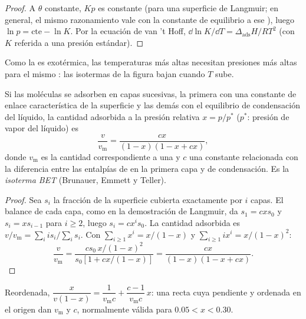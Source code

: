 \begin{proof}
A $\theta$ constante, $Kp$ es constante (para una superficie de Langmuir; en general, el mismo
razonamiento vale con la constante de equilibrio a ese ), luego $\ln p =
\text{cte} - \ln K$. Por la ecuación de van 't Hoff, $\dd\ln K/\dd T = \Delta_{\mathrm{ads}}H/RT^2$ (con $K$
referida a una presión estándar).
\end{proof}

Como la  es exotérmica, las temperaturas más altas necesitan presiones más altas para
el mismo : las isotermas de la figura bajan cuando $T$ sube.

\begin{theorem}\label{thm:b3:surfaces-catalysis:bet}
Si las moléculas se adsorben en capas sucesivas, la primera con una constante de enlace
característica de la superficie y las demás con el equilibrio de condensación
del líquido, la cantidad adsorbida a la presión relativa $x = p/p^*$ ($p^*$: presión de vapor
del  líquido) es
\[
  \frac{v}{v_{\mathrm m}} = \frac{cx}{(1 - x)(1 - x + cx)},
\]
donde $v_{\mathrm m}$ es la cantidad correspondiente a una  y $c$ una constante relacionada con la
diferencia entre las entalpías de  en la primera capa y de
condensación. Es la \emph{isoterma BET} (Brunauer,
Emmett y Teller).
\end{theorem}

\begin{proof}
Sea $s_i$ la fracción de la superficie cubierta exactamente por $i$ capas. El
balance de cada capa, como en la demostración de Langmuir, da $s_1 = cxs_0$ y $s_i =
xs_{i-1}$ para $i \ge 2$, luego $s_i = cx^is_0$. La cantidad adsorbida es $v/v_{\mathrm m} =
\sum_iis_i/\sum_is_i$. Con $\sum_{i\ge1}x^i = x/(1 - x)$ y $\sum_{i\ge1}ix^i = x/(1 - x)^2$:
\[
  \frac{v}{v_{\mathrm m}} = \frac{cs_0\,x/(1 - x)^2}{s_0[1 + cx/(1 - x)]} = \frac{cx}{(1 - x)(1 - x + cx)} .
\]
\end{proof}

Reordenada, $\dfrac{x}{v(1 - x)} = \dfrac{1}{v_{\mathrm m}c} + \dfrac{c - 1}{v_{\mathrm m}c}\,x$: una recta cuya pendiente y
ordenada en el origen dan $v_{\mathrm m}$ y $c$, normalmente válida para $0.05 < x < 0.30$.

